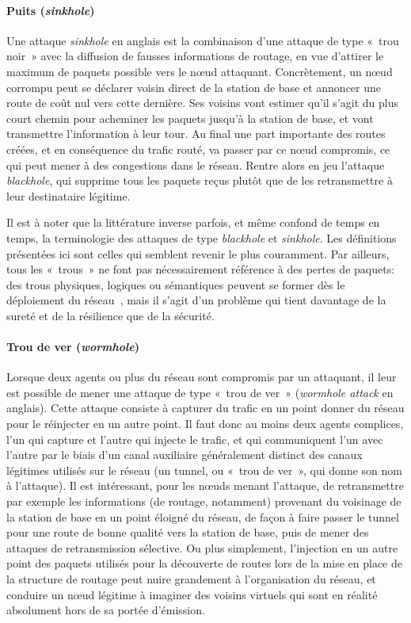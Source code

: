         \paragraph{Puits (\textit{sinkhole})}
Une attaque \textit{sinkhole} en anglais est la combinaison d'une attaque de type « trou noir » avec la diffusion de fausses informations de routage, en vue d'attirer le maximum de paquets possible vers le nœud attaquant.
Concrètement, un nœud corrompu peut se déclarer voisin direct de la station de base et annoncer une route de coût nul vers cette dernière.
Ses voisins vont estimer qu'il s'agit du plus court chemin pour acheminer les paquets jusqu'à la station de base, et vont transmettre l'information à leur tour.
Au final une part importante des routes créées, et en conséquence du trafic routé, va passer par ce nœud compromis, ce qui peut mener à des congestions dans le réseau.
Rentre alors en jeu l'attaque \textit{blackhole}, qui supprime tous les paquets reçus plutôt que de les retransmettre à leur destinataire légitime.

Il est à noter que la littérature inverse parfois, et même confond de temps en temps, la terminologie des attaques de type \textit{blackhole} et \textit{sinkhole}.
Les définitions présentées ici sont celles qui semblent revenir le plus couramment.
Par ailleurs, tous les « trous » ne font pas nécessairement référence à des pertes de paquets: des trous physiques, logiques ou sémantiques peuvent se former dès le déploiement du réseau~\cite{JSM13}, mais il s'agit d'un problème qui tient davantage de la sureté et de la résilience que de la sécurité.

        \paragraph{Trou de ver (\textit{wormhole})}
Lorsque deux agents ou plus du réseau sont compromis par un attaquant, il leur est possible de mener une attaque de type « trou de ver » (\textit{wormhole attack} en anglais).
Cette attaque consiste à capturer du trafic en un point donner du réseau pour le réinjecter en un autre point.
Il faut donc au moins deux agents complices, l'un qui capture et l'autre qui injecte le trafic, et qui communiquent l'un avec l'autre par le biais d'un canal auxiliaire généralement distinct des canaux légitimes utilisés sur le réseau (un tunnel, ou « trou de ver », qui donne son nom à l'attaque).
Il est intéressant, pour les nœuds menant l'attaque, de retransmettre par exemple les informations (de routage, notamment) provenant du voisinage de la station de base en un point éloigné du réseau, de façon à faire passer le tunnel pour une route de bonne qualité vers la station de base, puis de mener des attaques de retransmission sélective.
Ou plus simplement, l'injection en un autre point des paquets utilisés pour la découverte de routes lors de la mise en place de la structure de routage peut nuire grandement à l'organisation du réseau, et conduire un nœud légitime à imaginer des voisins virtuels qui sont en réalité absolument hors de sa portée d'émission.

